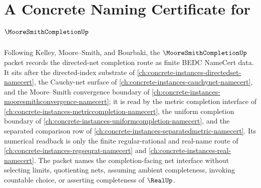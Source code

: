 \chapter{A Concrete Naming Certificate for $\MooreSmithCompletionUp$}
\label{ch:concrete-instances-moore-smith-completion-namecert}

Following Kelley, Moore--Smith, and Bourbaki, the $\MooreSmithCompletionUp$ packet records the directed-net completion route as finite BEDC NameCert data. It sits after the directed-index substrate of \autoref{ch:concrete-instances-directedset-namecert}, the Cauchy-net surface of \autoref{ch:concrete-instances-cauchynet-namecert}, and the Moore--Smith convergence boundary of \autoref{ch:concrete-instances-mooresmithconvergence-namecert}; it is read by the metric completion interface of \autoref{ch:concrete-instances-metriccompletion-namecert}, the uniform completion boundary of \autoref{ch:concrete-instances-uniformcompletion-namecert}, and the separated comparison row of \autoref{ch:concrete-instances-separatedmetric-namecert}. Its numerical readback is only the finite regular-rational and real-name route of \autoref{ch:concrete-instances-regseqrat-namecert} and \autoref{ch:concrete-instances-real-namecert}. The packet names the completion-facing net interface without selecting limits, quotienting nets, assuming ambient completeness, invoking countable choice, or asserting completeness of $\RealUp$.


